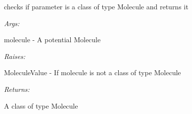 \documentclass[letterpaper,10pt,english]{sphinxmanual}
\begin{document}
\begin{fulllineitems}
\label{modules/index:aosb.core.checkAndSetMolecule}
checks if parameter is a class of type Molecule and returns it

\begin{DUlineblock}{0em}
\item[] \emph{Args:}
\item[]
\begin{DUlineblock}{\DUlineblockindent}
\item[] molecule - A potential Molecule
\end{DUlineblock}
\end{DUlineblock}

\begin{DUlineblock}{0em}
\item[] \emph{Raises:}
\item[]
\begin{DUlineblock}{\DUlineblockindent}
\item[] MoleculeValue - If molecule is not a class of type Molecule
\end{DUlineblock}
\end{DUlineblock}

\begin{DUlineblock}{0em}
\item[] \emph{Returns:}
\item[]
\begin{DUlineblock}{\DUlineblockindent}
\item[] A class of type Molecule
\end{DUlineblock}
\end{DUlineblock}

\end{fulllineitems}

\end{document}
